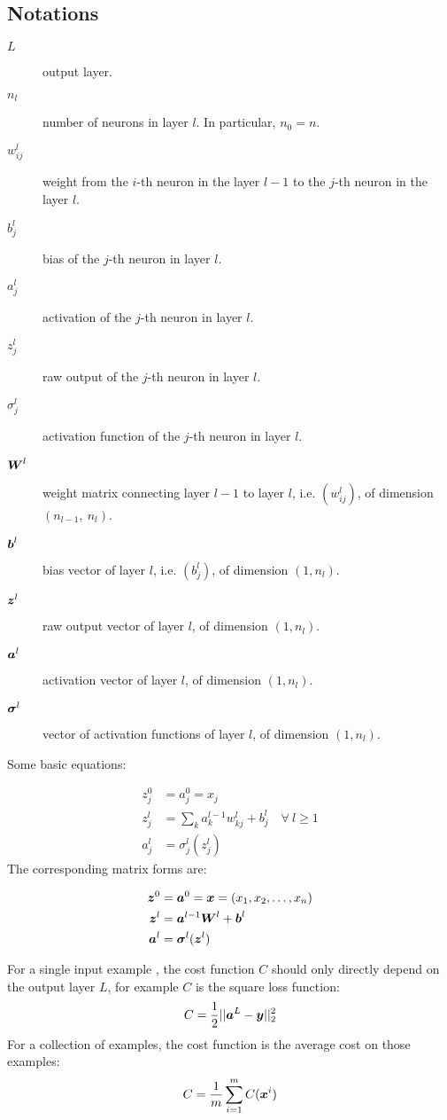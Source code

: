 \subsection{Notations}
\begin{description}
    \item[$L$] output layer.
    \item[$n_l$] number of neurons in layer $l$. In particular, $n_0 = n$.
    \item[$w^l_{ij}$] weight from the $i$-th neuron in the layer $l-1$ to the $j$-th neuron in the layer $l$.
    \item[$b^l_j$] bias of the $j$-th neuron in layer $l$.
    \item[$a^l_j$] activation of the $j$-th neuron in layer $l$.
    \item[$z^l_j$] raw output of the $j$-th neuron in layer $l$.
    \item[$\sigma^l_j$] activation function of the $j$-th neuron in layer $l$.
    \item[$\boldsymbol{W}^l$] weight matrix connecting layer $l-1$ to layer $l$, i.e. $(w^l_{ij})$, of dimension 
    $(n_{l-1},\ n_l)$.
    \item[$\boldsymbol{b}^l$] bias vector of layer $l$, i.e. $(b^l_j)$, of dimension $(1, n_l)$.
    \item[$\boldsymbol{z}^l$] raw output vector of layer $l$, of dimension $(1, n_l)$.
    \item[$\boldsymbol{a}^l$] activation vector of layer $l$, of dimension $(1, n_l)$.
    \item[$\boldsymbol{\sigma}^l$] vector of activation functions of layer $l$, of dimension $(1, n_l)$.
\end{description}

Some basic equations:

\begin{align}
    z^0_j &= a^0_j = x_j\\
    z^l_j &= \sum_k a^{l-1}_{k} w^l_{kj} + b^l_j\quad\forall~l\geq 1\\
    a^l_j &= \sigma^l_j(z^l_j)
\end{align}
The corresponding matrix forms are:

\begin{align}
    \boldsymbol{z}^0 &= \boldsymbol{a}^0 = \boldsymbol{x} = (x_1, x_2, \ldots, x_{n})\\
    \boldsymbol{z}^l &= \boldsymbol{a}^{l-1} \boldsymbol{W}^l + \boldsymbol{b}^l\\
    \boldsymbol{a}^l &= \boldsymbol{\sigma}^l(\boldsymbol{z}^l)
\end{align}

For a single input example , the cost function $C$ should only directly depend on the output layer $L$,
for example $C$ is the square loss function:
\begin{equation}\label{nn_square_loss}
    C = \frac{1}{2} ||\boldsymbol{a}^L - \boldsymbol{y}||^2_2
\end{equation}
For a collection of examples, the cost function is the average cost on those examples:
\begin{equation}
    C = \frac{1}{m} \sum_{i=1}^m C(\boldsymbol{x}^i)
\end{equation}


